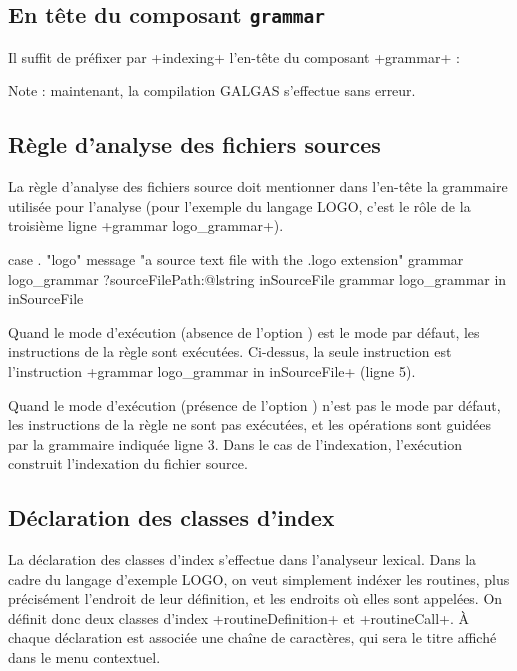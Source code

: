 \subsection{En tête du composant \texttt{grammar}}

Il suffit de préfixer par \ggs+indexing+ l'en-tête du composant \ggs+grammar+ :

\begin{galgas}
indexing grammar logo_grammar ... {
  ...
\end{galgas}

Note : maintenant, la compilation GALGAS s'effectue sans erreur.




\subsection{Règle d'analyse des fichiers sources}

La règle d'analyse des fichiers source doit mentionner dans l'en-tête la grammaire utilisée pour l'analyse (pour l'exemple du langage LOGO, c'est le rôle de la troisième ligne \ggs+grammar logo_grammar+).

\begin{galgas}
case . "logo"
message "a source text file with the .logo extension"
grammar logo_grammar
?sourceFilePath:@lstring inSourceFile {
  grammar logo_grammar in inSourceFile
}
\end{galgas}

Quand le mode d'exécution (absence de l'option ) est le mode par défaut, les instructions de la règle sont exécutées. Ci-dessus, la seule instruction est l'instruction \ggs+grammar logo_grammar in inSourceFile+ (ligne 5).

Quand le mode d'exécution (présence de l'option ) n'est pas le mode par défaut, les instructions de la règle ne sont pas exécutées, et les opérations sont guidées par la grammaire indiquée ligne 3. Dans le cas de l'indexation, l'exécution construit l'indexation du fichier source.









\subsection{Déclaration des classes d'index}

La déclaration des classes d'index s'effectue dans l'analyseur lexical. Dans la cadre du langage d'exemple LOGO, on veut simplement indéxer les routines, plus précisément l'endroit de leur définition, et les endroits où elles sont appelées. On définit donc deux classes d'index \ggs+routineDefinition+ et \ggs+routineCall+. À chaque déclaration est associée une chaîne de caractères, qui sera le titre affiché dans le menu contextuel. 


